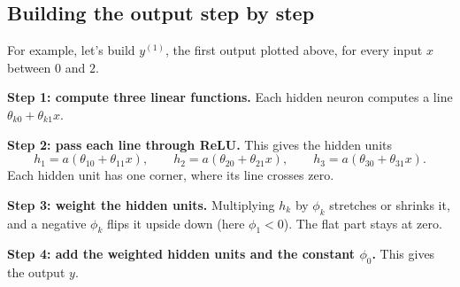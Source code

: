 \documentclass[a4paper,12pt,oneside]{report}
\begin{document}
\subsection{Building the output step by step}

For example, let's build $y^{(1)}$, the first output plotted above, for every input
$x$ between $0$ and $2$.

\textbf{Step 1: compute three linear functions.} Each hidden neuron
computes a line $\theta_{k0}+\theta_{k1}x$.
\begin{center}
\end{center}

\textbf{Step 2: pass each line through ReLU.} This gives the hidden
units
\[
  h_1=a(\theta_{10}+\theta_{11}x),\qquad
  h_2=a(\theta_{20}+\theta_{21}x),\qquad
  h_3=a(\theta_{30}+\theta_{31}x).
\]
Each hidden unit has one corner, where its line crosses zero.
\begin{center}
\end{center}

\textbf{Step 3: weight the hidden units.} Multiplying $h_k$ by $\phi_k$
stretches or shrinks it, and a negative $\phi_k$ flips it upside
down (here $\phi_1<0$). The flat part stays at zero.
\begin{center}
\end{center}

\textbf{Step 4: add the weighted hidden units and the constant
$\phi_0$.} This gives the output $y$.
\begin{center}
\end{center}
\end{document}

